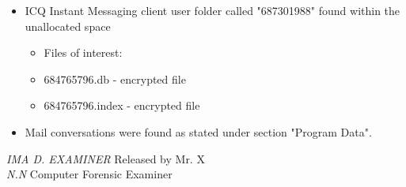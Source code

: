 \begin{enumerate}
\begin{itemize}
\begin{itemize}
\begin{itemize}
		 \end{itemize}
		 
		 \item ICQ Instant Messaging client user folder called "687301988" found within the unallocated space
		 \begin{itemize}
		 	\item Files of interest: 
		 	\item 684765796.db - encrypted file
		 	\item 684765796.index - encrypted file
		 \end{itemize}
		 
		 \item Mail conversations were found as stated under section "Program Data". 
		 
		 
	\end{itemize}
	
		
	
\end{itemize}

\end{enumerate}

\noindent \textit{IMA D. EXAMINER}	\hfill Released by {\wesa Mr. X}\\
\textit{N.N} Computer Forensic Examiner
\clearpage
